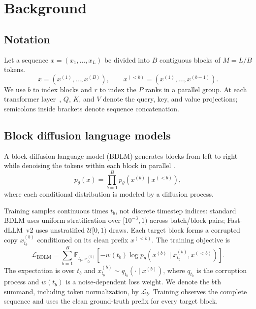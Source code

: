 \section{Background}
\label{sec:background}

\subsection{Notation}
Let a sequence $x=(x_1,\ldots,x_L)$ be divided into $B$ contiguous blocks of
$M=L/B$ tokens.
\begin{equation}
    x=\left(x^{(1)},\ldots,x^{(B)}\right),
    \qquad
    x^{(<b)}=\left(x^{(1)},\ldots,x^{(b-1)}\right).
\end{equation}
We use $b$ to index blocks and $r$ to index the $P$ ranks in a parallel group.
At each transformer layer~\citep{vaswani2017attention}, $Q$, $K$, and $V$ denote the query, key, and value
projections; semicolons inside brackets denote sequence concatenation.

\subsection{Block diffusion language models}

A block diffusion language model (BDLM) generates blocks from left to right
while denoising the tokens within each block in parallel
\citep{arriola2025blockdiffusion}.
\begin{equation}
    p_\theta(x)
    =
    \prod_{b=1}^{B}
    p_\theta\!\left(x^{(b)}\mid x^{(<b)}\right),
    \label{eq:bdlm-factorization}
\end{equation}
where each conditional distribution is modeled by a diffusion process.

Training samples continuous times $t_b$, not discrete timestep indices:
standard BDLM uses uniform stratification over $[10^{-3},1)$ across batch/block
pairs; Fast-dLLM~v2 uses unstratified $\mathcal{U}[0,1)$ draws.
Each target block forms a corrupted copy $x_{t_b}^{(b)}$ conditioned on its
clean prefix $x^{(<b)}$. The training objective is
\begin{equation}
    \mathcal{L}_{\mathrm{BDLM}}
    =
    \sum_{b=1}^{B}
        \mathbb{E}_{t_b,\,x_{t_b}^{(b)}}\!\left[
            -w(t_b)\log p_\theta\!\left(
                x^{(b)} \mid x_{t_b}^{(b)},x^{(<b)}
            \right)
        \right].
    \label{eq:bdlm-training-objective}
\end{equation}
The expectation is over $t_b$ and
$x_{t_b}^{(b)}\sim q_{t_b}(\cdot\mid x^{(b)})$, where $q_{t_b}$ is the
corruption process and $w(t_b)$ is a noise-dependent loss weight. We denote
the $b$th summand, including token normalization, by $\mathcal{L}_b$. Training
observes the complete sequence and uses the clean ground-truth prefix for every
target block.

